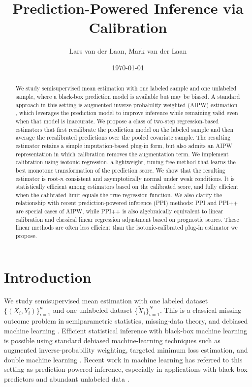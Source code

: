 \documentclass{article}
\title{Prediction-Powered Inference via Calibration}
\author{Lars van der Laan, Mark van der Laan}
\date{\today}
\theoremstyle{plain}
\theoremstyle{definition}
\newcommand{\1}{\mathbbm{1}}
\begin{document}
\maketitle
\begin{abstract}
We study semisupervised mean estimation with one labeled sample and one unlabeled sample, where a black-box prediction model is available but may be biased. A standard approach in this setting is augmented inverse probability weighted (AIPW) estimation \citep{robins1995analysis}, which leverages the prediction model to improve inference while remaining valid even when that model is inaccurate. We propose a class of two-step regression-based estimators that first recalibrate the prediction model on the labeled sample and then average the recalibrated predictions over the pooled covariate sample. The resulting estimator retains a simple imputation-based plug-in form, but also admits an AIPW representation in which calibration removes the augmentation term. We implement calibration using isotonic regression, a lightweight, tuning-free method that learns the best monotone transformation of the prediction score. We show that the resulting estimator is root-\(n\) consistent and asymptotically normal under weak conditions. It is statistically efficient among estimators based on the calibrated score, and fully efficient when the calibrated limit equals the true regression function. We also clarify the relationship with recent prediction-powered inference (PPI) methods: PPI and PPI++ are special cases of AIPW, while PPI++ is also algebraically equivalent to linear calibration and classical linear regression adjustment based on prognostic scores. These linear methods are often less efficient than the isotonic-calibrated plug-in estimator we propose.
\end{abstract}

\section{Introduction}
We study semisupervised mean estimation with one labeled dataset \(\{(X_i, Y_i)\}_{i=1}^n\) and one unlabeled dataset \(\{\widetilde X_i\}_{i=1}^N\). This is a classical missing-outcome problem in semiparametric statistics, missing-data theory, and debiased machine learning \citep{rubin1976,robinsCausal,robins1995analysis,bang2005doubly,vanderlaanunified,vanderLaanRose2011,DoubleML}. Efficient statistical inference with black-box machine learning is possible using standard debiased machine-learning techniques such as augmented inverse-probability weighting, targeted minimum loss estimation, and double machine learning \citep{li2023efficient,graham2024towards}. Recent work in machine learning has referred to this setting as prediction-powered inference, especially in applications with black-box predictors and abundant unlabeled data \citep{ppi2023,crossppi2024}.
 
\end{document}

